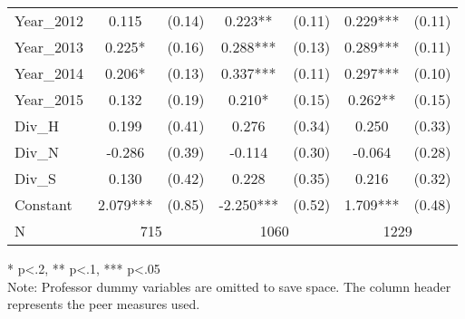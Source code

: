 {\begin{threeparttable}
\begin{tabular}{l|c|c|c|c|c|c}
      Year\_2012 & 0.115                    & (0.14)                    & 0.223**   & (0.11) & 0.229***  & (0.11) \\
      Year\_2013 & 0.225*                   & (0.16)                    & 0.288***  & (0.13) & 0.289***  & (0.11) \\
      Year\_2014 & 0.206*                   & (0.13)                    & 0.337***  & (0.11) & 0.297***  & (0.10) \\
      Year\_2015 & 0.132                    & (0.19)                    & 0.210*    & (0.15) & 0.262**   & (0.15) \\
      Div\_H       & 0.199                    & (0.41)                    & 0.276     & (0.34) & 0.250     & (0.33) \\
      Div\_N       & -0.286                   & (0.39)                    & -0.114    & (0.30) & -0.064    & (0.28) \\
      Div\_S       & 0.130                    & (0.42)                    & 0.228     & (0.35) & 0.216     & (0.32) \\
      Constant          & 2.079***                 & (0.85)                    & -2.250*** & (0.52) & 1.709***  & (0.48) \\
      \hline
      N                 & \multicolumn{2}{|c}{715} & \multicolumn{2}{|c}{1060} & \multicolumn{2}{|c}{1229}               \\
      \hline
      \hline
    \end{tabular}
    \begin{tablenotes}
    \item{* p<.2, ** p<.1, *** p<.05 \\ Note: Professor dummy variables are omitted to save space. The column header represents the peer measures used.}
    \end{tablenotes}
  \end{threeparttable}
}

\clearpage{}

\newpage{}

